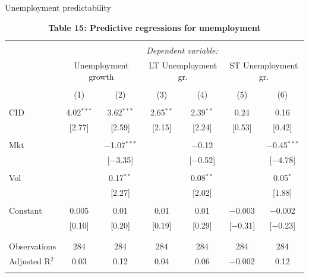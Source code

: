 \documentclass{beamer}
\begin{document}
\scriptsize
\begin{frame}{Unemployment predictability}
\begin{table}[!htbp] \centering 
  \caption*{\textbf{Table 15: Predictive regressions for unemployment}} 
  \vspace{-0.2cm}
\begin{tabular}{@{\extracolsep{2pt}}lcccccc} 
\\[-1.8ex]\hline 
\hline \\[-1.8ex] 
 & \multicolumn{6}{c}{\textit{Dependent variable:}} \\ 
\cline{2-7} 
 & \multicolumn{2}{c}{Unemployment growth} & \multicolumn{2}{c}{LT Unemployment gr.} & \multicolumn{2}{c}{ST Unemployment gr.} \\ 
\\[-1.8ex] & (1) & (2) & (3) & (4) & (5) & (6)\\ 
\hline \\[-1.8ex] 
 CID & 4.02$^{***}$ & 3.62$^{***}$ & 2.65$^{**}$ & 2.39$^{**}$ & 0.24 & 0.16 \\ 
  & [2.77] & [2.59] & [2.15] & [2.24] & [0.53] & [0.42] \\
  & & & & & & \\ 
 Mkt &  & $-$1.07$^{***}$ &  & $-$0.12 &  & $-$0.45$^{***}$ \\ 
  &  & [$-$3.35] &  & [$-$0.52] &  & [$-$4.78] \\ 
  & & & & & & \\ 
 Vol &  & 0.17$^{**}$ &  & 0.08$^{**}$ &  & 0.05$^{*}$ \\ 
  &  & [2.27] &  & [2.02] &  & [1.88] \\ 
  & & & & & & \\ 
 Constant & 0.005 & 0.01 & 0.01 & 0.01 & $-$0.003 & $-$0.002 \\ 
  & [0.10] & [0.20] & [0.19] & [0.29] & [$-$0.31] & [$-$0.23] \\ 
  & & & & & & \\ 
\hline \\[-1.8ex] 
Observations & 284 & 284 & 284 & 284 & 284 & 284 \\ 
Adjusted R$^{2}$ & 0.03 & 0.12 & 0.04 & 0.06 & $-$0.002 & 0.12 \\ 
\hline 
\hline \\[-1.8ex] 

\end{tabular}  
\end{table}
\end{frame}
\end{document}
